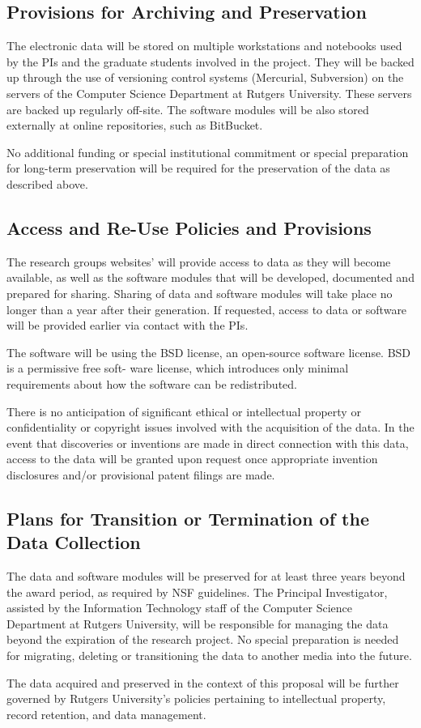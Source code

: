 \subsection{Provisions for Archiving and Preservation}
The electronic data will be stored on multiple workstations and notebooks used by the PIs and the graduate students involved in the project. They will be backed up through the use of versioning control systems (Mercurial, Subversion) on the servers of the Computer Science Department at Rutgers University. These servers are backed up regularly off-site. The software modules will be also stored externally at online repositories, such as BitBucket. 

No additional funding or special institutional commitment or special preparation for long-term preservation will be required for the preservation of the data as described above. 

\subsection{Access and Re-Use Policies and Provisions}
The research groups websites’ will provide access to data as they will become available, as well as the software modules that will be developed, documented and prepared for sharing. Sharing of data and software modules will take place no longer than a year after their generation. If requested, access to data or software will be provided earlier via contact with the PIs. 

The software will be using the BSD license, an open-source software license. BSD is a permissive free soft- ware license, which introduces only minimal requirements about how the software can be redistributed. 

There is no anticipation of significant ethical or intellectual property or confidentiality or copyright issues involved with the acquisition of the data. In the event that discoveries or inventions are made in direct connection with this data, access to the data will be granted upon request once appropriate invention disclosures and/or provisional patent filings are made. 

\subsection{Plans for Transition or Termination of the Data Collection}
The data and software modules will be preserved for at least three years beyond the award period, as required by NSF guidelines. The Principal Investigator, assisted by the Information Technology staff of the Computer Science Department at Rutgers University, will be responsible for managing the data beyond the expiration of the research project. No special preparation is needed for migrating, deleting or transitioning the data to another media into the future. 

The data acquired and preserved in the context of this proposal will be further governed by Rutgers University’s policies pertaining to intellectual property, record retention, and data management. 